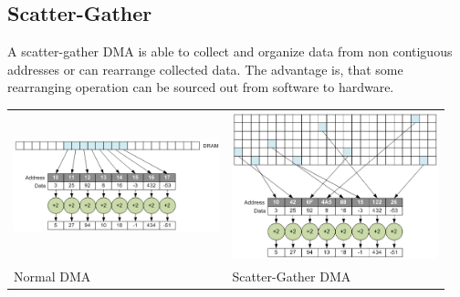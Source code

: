 	\subsection{Scatter-Gather}
		A scatter-gather DMA is able to collect and organize data from non contiguous addresses or can rearrange collected data. The advantage is, that some rearranging operation can be sourced out from software to hardware.
		\begin{longtable}{p{0.475\linewidth}p{0.475\linewidth}}		 			
			\includegraphics[width=1\linewidth]{./pictures/scatter1.png}
			& \includegraphics[width=1\linewidth]{./pictures/scatter2.png} \\
			
			Normal DMA 
			& Scatter-Gather DMA\\
		\end{longtable}
